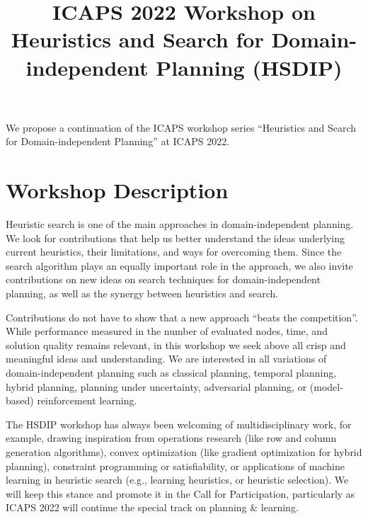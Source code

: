 \documentclass[10pt]{article}
\begin{document}
\title{ICAPS 2022 Workshop on Heuristics and Search for Domain-independent
Planning (HSDIP)%
}
\date{}

\author{}

\maketitle

\vspace{-2cm}


We propose a continuation of the ICAPS workshop series ``Heuristics
and Search for Domain-independent Planning'' at ICAPS 2022.

\section*{Workshop Description}
Heuristic search is one of the main approaches in domain-independent
planning.  We look for contributions that help us better
understand the ideas underlying current heuristics, their limitations,
and ways for overcoming them.
%
Since the search algorithm plays an equally important role in the
approach, we also invite contributions on new ideas on search
techniques for domain-independent planning, as well as the synergy
between heuristics and search.

Contributions do not have to show that a new approach ``beats the competition''.
While performance measured in the number of evaluated nodes, time, and solution
quality remains relevant, in this workshop we seek above all crisp and
meaningful ideas and understanding.
%
We are interested in all variations of domain-independent planning
such as classical planning, temporal planning, hybrid planning, planning under
uncertainty, adversarial planning, or (model-based) reinforcement learning.

The HSDIP workshop has always been welcoming of multidisciplinary work,
for example, drawing inspiration from operations research (like row and
column generation algorithms), convex optimization (like gradient
optimization for hybrid planning), constraint programming or
satisfiability, or applications of machine learning in heuristic search
(e.g., learning heuristics, or heuristic selection). We will keep this
stance and promote it in the Call for Participation, particularly as ICAPS 2022
will continue the special track on planning \& learning.
\end{document}
